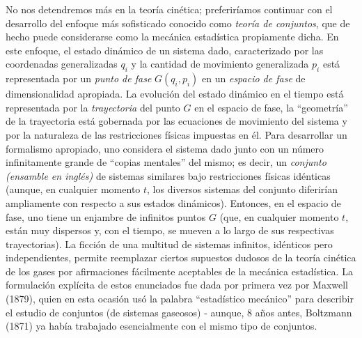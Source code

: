 No nos detendremos más en la teoría cinética; preferiríamos continuar con el desarrollo del enfoque más sofisticado conocido como \emph{teoría de conjuntos}, que de hecho puede considerarse como la mecánica estadística propiamente dicha. En este enfoque, el estado dinámico de un sistema dado, caracterizado por las coordenadas generalizadas $q_{i}$ y la cantidad de movimiento generalizada $p_{i}$ está representada por un \emph{punto de fase} $G (q_{i}, p_{i})$ en un \emph{espacio de fase} de dimensionalidad apropiada. La evolución del estado dinámico en el tiempo está representada por la \emph{trayectoria} del punto $G$ en el espacio de fase, la \enquote{geometría} de la trayectoria está gobernada por las ecuaciones de movimiento del sistema y por la naturaleza de las restricciones físicas impuestas en él. Para desarrollar un formalismo apropiado, uno considera el sistema dado junto con un número infinitamente grande de \enquote{copias mentales} del mismo; es decir, un \emph{conjunto (ensamble en inglés)} de sistemas similares bajo restricciones físicas idénticas (aunque, en cualquier momento $t$, los diversos sistemas del conjunto diferirían ampliamente con respecto a sus estados dinámicos). Entonces, en el espacio de fase, uno tiene un enjambre de infinitos puntos $G$ (que, en cualquier momento $t$, están muy dispersos y, con el tiempo, se mueven a lo largo de sus respectivas trayectorias). La ficción de una multitud de sistemas infinitos, idénticos pero independientes, permite reemplazar ciertos supuestos dudosos de la teoría cinética de los gases por afirmaciones fácilmente aceptables de la mecánica estadística. La formulación explícita de estos enunciados fue dada por primera vez por Maxwell (1879), quien en esta ocasión usó la palabra \enquote{estadístico mecánico} para describir el estudio de conjuntos (de sistemas gaseosos) - aunque, 8 años antes, Boltzmann (1871) ya había trabajado esencialmente con el mismo tipo de conjuntos.
\par
